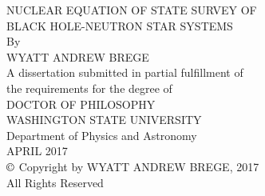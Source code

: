 \label{chap:title}

\begin{titlepage}
  \begin{singlespace}
    \begin{center}
      {\uppercase{
          Nuclear Equation of State Survey of\\
          \bigskip
          Black Hole-Neutron Star Systems}}\\
      \vspace{1.31in}
      By\\
      \bigskip
      \uppercase{Wyatt Andrew Brege}\\
      \vspace{2.65in}
      A dissertation submitted in partial fulfillment of\\
      the requirements for the degree of\\
      \bigskip
      \uppercase{Doctor of Philosophy}\\
      \bigskip \bigskip \bigskip
      \uppercase{Washington State University}\\
      Department of Physics and Astronomy\\
      \bigskip
      \uppercase{April 2017}\\
      \bigskip \bigskip
      $\copyright$ Copyright by WYATT ANDREW BREGE, 2017\\
      All Rights Reserved
    \end{center}
  \end{singlespace}
\end{titlepage}
\newpage
